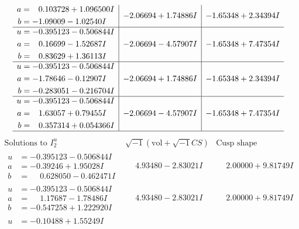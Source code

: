 \documentclass[1p]{elsarticle_modified}
\theoremstyle{definition}
\newcommand{\I}{\sqrt{-1}}
\begin{document}
$$\begin{array}{c|c|c}
\begin{aligned}
a &= \phantom{-}0.103728 + 1.096500 I \\
b &= -1.09009 - 1.02540 I\end{aligned}
 & -2.06694 + 1.74886 I & -1.65348 + 2.34394 I \\ \hline\begin{aligned}
u &= -0.395123 - 0.506844 I \\
a &= \phantom{-}0.16699 - 1.52687 I \\
b &= \phantom{-}0.83629 + 1.36113 I\end{aligned}
 & -2.06694 - 4.57907 I & -1.65348 + 7.47354 I \\ \hline\begin{aligned}
u &= -0.395123 - 0.506844 I \\
a &= -1.78646 - 0.12907 I \\
b &= -0.283051 - 0.216704 I\end{aligned}
 & -2.06694 + 1.74886 I & -1.65348 + 2.34394 I \\ \hline\begin{aligned}
u &= -0.395123 - 0.506844 I \\
a &= \phantom{-}1.63057 + 0.79455 I \\
b &= \phantom{-}0.357314 + 0.054366 I\end{aligned}
 & -2.06694 - 4.57907 I & -1.65348 + 7.47354 I\\
 \hline 
 \end{array}$$\newpage$$\begin{array}{c|c|c}  
\text{Solutions to }I^u_{2}& \I (\text{vol} + \sqrt{-1}CS) & \text{Cusp shape}\\
 \hline 
\begin{aligned}
u &= -0.395123 - 0.506844 I \\
a &= -0.39246 + 1.95028 I \\
b &= \phantom{-}0.628050 - 0.462471 I\end{aligned}
 & \phantom{-}4.93480 - 2.83021 I & \phantom{-}2.00000 + 9.81749 I \\ \hline\begin{aligned}
u &= -0.395123 - 0.506844 I \\
a &= \phantom{-}1.17687 - 1.78486 I \\
b &= -0.547258 + 1.222920 I\end{aligned}
 & \phantom{-}4.93480 - 2.83021 I & \phantom{-}2.00000 + 9.81749 I \\ \hline\begin{aligned}
u &= -0.10488 + 1.55249 I \\

\end{aligned}
\end{array}$$
\end{document}
